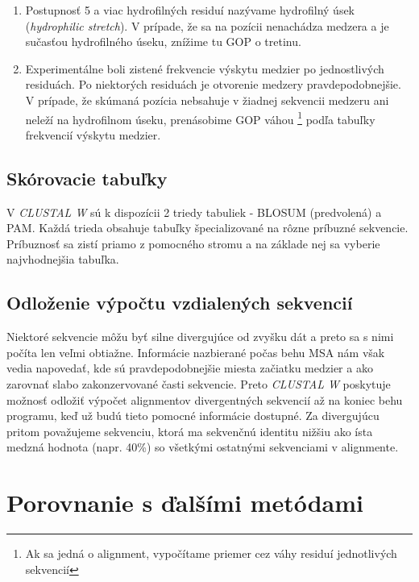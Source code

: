 \documentclass[nobib]{tufte-handout}
\begin{document}
\begin{itemize}
\begin{enumerate}
\item Postupnosť 5 a viac hydrofilných residuí nazývame hydrofilný úsek (\emph{hydrophilic stretch}). V prípade, že sa na pozícii nenachádza medzera a je sučasťou hydrofilného úseku, znížime tu GOP o tretinu.

\item Experimentálne boli zistené frekvencie výskytu medzier po jednostlivých residuách. Po niektorých residuách je otvorenie medzery pravdepodobnejšie. V prípade, že skúmaná pozícia nebsahuje v žiadnej sekvencii medzeru ani neleží na hydrofilnom úseku, prenásobime GOP váhou \footnote{Ak sa jedná o alignment, vypočítame priemer cez váhy residuí jednotlivých sekvencií} podľa tabuľky frekvencií výskytu medzier.
\end{enumerate}

\end{itemize}

\subsection{Skórovacie tabuľky}\label{sec:tables}

V \emph{CLUSTAL W} sú k dispozícii 2 triedy tabuliek - BLOSUM (predvolená) a PAM. Každá trieda obsahuje tabuľky špecializované na rôzne príbuzné sekvencie. Príbuznosť sa zistí priamo z pomocného stromu a na základe nej sa vyberie najvhodnejšia tabuľka.

\subsection{Odloženie výpočtu vzdialených sekvencií}\label{sec:delay} 

Niektoré sekvencie môžu byť silne divergujúce od zvyšku dát a preto sa s nimi počíta len veľmi obtiažne. Informácie nazbierané počas behu MSA nám však vedia napovedať, kde sú pravdepodobnejšie miesta začiatku medzier a ako zarovnať slabo zakonzervované časti sekvencie. Preto \emph{CLUSTAL W} poskytuje možnosť odložiť výpočet alignmentov divergentných sekvencií až na koniec behu programu, keď už budú tieto pomocné informácie dostupné. Za divergujúcu pritom považujeme sekvenciu, ktorá ma sekvenčnú identitu nižšiu ako ísta medzná hodnota (napr. 40\%) so všetkými ostatnými sekvenciami v alignmente.

\section{\textbf{Porovnanie s ďalšími metódami}}\label{sec:conclusion}
\end{document}
